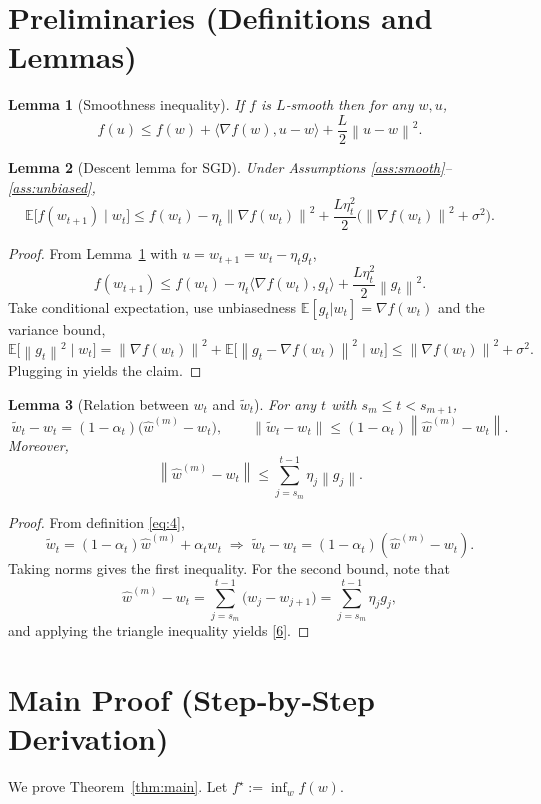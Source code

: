 \documentclass{article}
\newtheorem{lemma}{Lemma}
\newcommand{\E}{\mathbb{E}}
\newcommand{\norm}[1]{\left\lVert #1\right\rVert}
\begin{document}
\newpage
\section*{Preliminaries (Definitions and Lemmas)}
\begin{lemma}[Smoothness inequality]\label{lem:smooth}
If $f$ is $L$‑smooth then for any $w,u$,
\[
f(u)\le f(w)+\langle\nabla f(w),u-w\rangle+\frac{L}{2}\norm{u-w}^2 .
\]
\end{lemma}
\begin{lemma}[Descent lemma for SGD]\label{lem:sgd-descent}
Under Assumptions \ref{ass:smooth}–\ref{ass:unbiased},
\[
\E\!\bigl[f(w_{t+1})\mid w_t\bigr]\le
f(w_t)-\eta_t\norm{\nabla f(w_t)}^2+\frac{L\eta_t^2}{2}\bigl(\norm{\nabla f(w_t)}^2+\sigma^2\bigr).
\]
\end{lemma}
\begin{proof}
From Lemma~\ref{lem:smooth} with $u=w_{t+1}=w_t-\eta_t g_t$,
\[
f(w_{t+1})\le f(w_t)-\eta_t\langle\nabla f(w_t),g_t\rangle+\frac{L\eta_t^2}{2}\norm{g_t}^2 .
\]
Take conditional expectation, use unbiasedness $\E[g_t|w_t]=\nabla f(w_t)$ and the variance bound,
\[
\E\!\bigl[\norm{g_t}^2\mid w_t\bigr]=\norm{\nabla f(w_t)}^2+\E\!\bigl[\norm{g_t-\nabla f(w_t)}^2\mid w_t\bigr]\le
\norm{\nabla f(w_t)}^2+\sigma^2 .
\]
Plugging in yields the claim. \qedhere
\end{proof}

\begin{lemma}[Relation between $w_t$ and $\tilde w_t$]\label{lem:interp}
For any $t$ with $s_m\le t< s_{m+1}$,
\[
\tilde w_t-w_t = (1-\alpha_t)\bigl(\widehat w^{(m)}-w_t\bigr), \qquad
\norm{\tilde w_t-w_t}\le (1-\alpha_t)\norm{\widehat w^{(m)}-w_t}.
\]
Moreover,
\[
\norm{\widehat w^{(m)}-w_t}\le \sum_{j=s_m}^{t-1}\eta_j\norm{g_j}.
\tag{6}
\]
\end{lemma}
\begin{proof}
From definition \eqref{eq:4},
\[
\tilde w_t = (1-\alpha_t)\widehat w^{(m)}+\alpha_t w_t
\;\Longrightarrow\;
\tilde w_t-w_t = (1-\alpha_t)(\widehat w^{(m)}-w_t).
\]
Taking norms gives the first inequality. For the second bound, note that
\[
\widehat w^{(m)}-w_t = \sum_{j=s_m}^{t-1}\bigl(w_{j}-w_{j+1}\bigr)
= \sum_{j=s_m}^{t-1}\eta_j g_j,
\]
and applying the triangle inequality yields \eqref{6}. \qedhere
\end{proof}

\section*{Main Proof (Step‑by‑Step Derivation)}
We prove Theorem~\ref{thm:main}. Let $f^\star:=\inf_w f(w)$.
\end{document}

